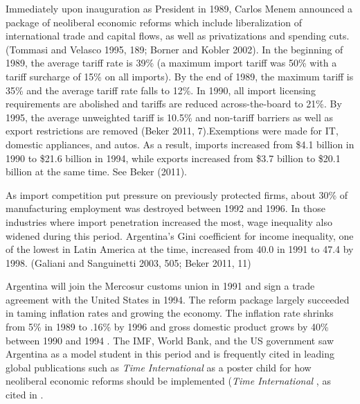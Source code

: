 \documentclass[12pt,a4paper]{article}\usepackage[]{graphicx}\usepackage[]{color}
\begin{document}
Immediately upon inauguration as President in 1989, Carlos Menem announced a package of neoliberal economic reforms which include liberalization of international trade and capital flows, as well as privatizations and spending cuts. (Tommasi and Velasco 1995, 189; Borner and Kobler 2002). In the beginning of 1989, the average tariff rate is 39\% (a maximum import tariff was 50\% with a tariff surcharge of 15\% on all imports). By the end of 1989, the maximum tariff is 35\% and the average tariff rate falls to 12\%. In 1990, all import licensing requirements are abolished and tariffs are reduced across-the-board to 21\%. By 1995, the average unweighted tariff is 10.5\% and non-tariff barriers as well as export restrictions are removed (Beker 2011, 7).Exemptions were made for IT, domestic appliances, and autos. As a result, imports increased from \$4.1 billion in 1990 to \$21.6 billion in 1994, while exports increased from \$3.7 billion to \$20.1 billion at the same time. See Beker (2011).

As import competition put pressure on previously protected firms, about 30\% of manufacturing employment was destroyed between 1992 and 1996. In those industries where import penetration increased the most, wage inequality also widened during this period. Argentina's Gini coefficient for income inequality, one of the lowest in Latin America at the time, increased from 40.0 in 1991 to 47.4 by 1998. (Galiani and Sanguinetti 2003, 505; Beker 2011, 11)

Argentina will join the Mercosur customs union in 1991 and sign a trade agreement with the United States in 1994. The reform package largely succeeded in taming inflation rates and growing the economy. The inflation rate shrinks from 5\% in 1989 to .16\% by 1996 and gross domestic product grows by 40\% between 1990 and 1994 \parencite[4]{Beker:2011vq}. The IMF, World Bank, and the US government saw Argentina as a model student in this period \parencites[142]{Cavallo:2004bf}{Cavallo:2004ta}[167]{Klein:2002vg} and is frequently cited in leading global publications such as \emph{Time International} as a poster child for how neoliberal economic reforms should be implemented (\emph{Time International} \cite*{:3GmqDB3y}, as cited in \cites[194]{Echegaray:2001tf}{MarcusDelgado:2003gn}{Silverstein:2002wm}.
\end{document}
